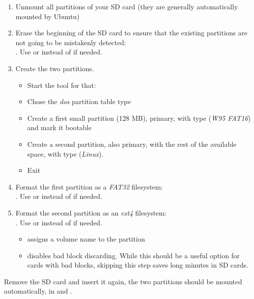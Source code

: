 \begin{enumerate}

\item Unmount all partitions of your SD card (they are generally
  automatically mounted by Ubuntu)

\item Erase the beginning of the SD card to ensure that the existing
  partitions are not going to be mistakenly detected:\\
  . Use
   or  instead of  if needed.

\item Create the two partitions.

  \begin{itemize}

  \item Start the  tool for that:\\

  \item Chose the {\em dos} partition table type

  \item Create a first small partition (128 MB), primary, with type
     ({\em W95 FAT16}) and mark it bootable

  \item Create a second partition, also primary, with the rest of the
    available space, with type  ({\em Linux}).

  \item Exit 

  \end{itemize}

\item Format the first partition as a {\em FAT32} filesystem:\\
  . Use 
  or  instead of  if needed.

\item Format the second partition as an {\em ext4} filesystem:\\
  . Use
   or  instead of  if needed.

\begin{itemize}
\item {} assigns a volume name to the partition
\item {} disables bad block discarding. While this
      should be a useful option for cards with bad blocks, skipping
      this step saves long minutes in SD cards.
\end{itemize}
\end{enumerate}

Remove the SD card and insert it again, the two partitions should be
mounted automatically, in  and
.
